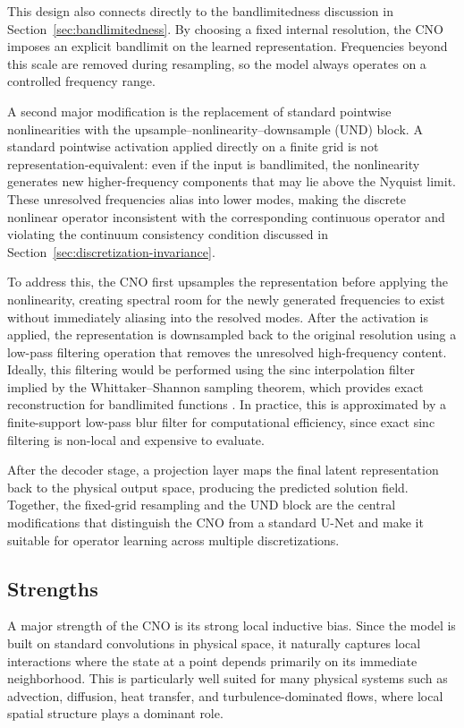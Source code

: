 This design also connects directly to the bandlimitedness discussion in Section~\ref{sec:bandlimitedness}. By choosing a fixed internal resolution, the CNO imposes an explicit bandlimit on the learned representation. Frequencies beyond this scale are removed during resampling, so the model always operates on a controlled frequency range.

A second major modification is the replacement of standard pointwise nonlinearities with the upsample--nonlinearity--downsample (UND) block. A standard pointwise activation applied directly on a finite grid is not representation-equivalent: even if the input is bandlimited, the nonlinearity generates new higher-frequency components that may lie above the Nyquist limit. These unresolved frequencies alias into lower modes, making the discrete nonlinear operator inconsistent with the corresponding continuous operator and violating the continuum consistency condition discussed in Section~\ref{sec:discretization-invariance}.

To address this, the CNO first upsamples the representation before applying the nonlinearity, creating spectral room for the newly generated frequencies to exist without immediately aliasing into the resolved modes. After the activation is applied, the representation is downsampled back to the original resolution using a low-pass filtering operation that removes the unresolved high-frequency content. Ideally, this filtering would be performed using the sinc interpolation filter implied by the Whittaker--Shannon sampling theorem, which provides exact reconstruction for bandlimited functions \cite{signals-and-systems}. In practice, this is approximated by a finite-support low-pass blur filter for computational efficiency, since exact sinc filtering is non-local and expensive to evaluate.

After the decoder stage, a projection layer maps the final latent representation back to the physical output space, producing the predicted solution field. Together, the fixed-grid resampling and the UND block are the central modifications that distinguish the CNO from a standard U-Net and make it suitable for operator learning across multiple discretizations.

\subsection{Strengths}

A major strength of the CNO is its strong local inductive bias. Since the model is built on standard convolutions in physical space, it naturally captures local interactions where the state at a point depends primarily on its immediate neighborhood. This is particularly well suited for many physical systems such as advection, diffusion, heat transfer, and turbulence-dominated flows, where local spatial structure plays a dominant role.


